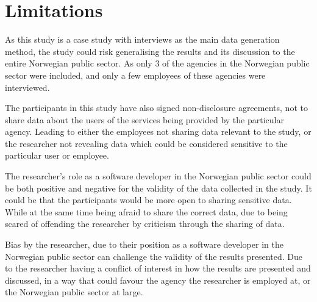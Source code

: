 

\section{Limitations}
As this study is a case study with interviews as the main data generation method, the study could risk generalising the results and its discussion to the entire Norwegian public sector. As only 3 of the agencies in the Norwegian public sector were included, and only a few employees of these agencies were interviewed.

The participants in this study have also signed non-disclosure agreements, not to share data about the users of the services being provided by the particular agency. Leading to either the employees not sharing data relevant to the study, or the researcher not revealing data which could be considered sensitive to the particular user or employee. 

The researcher's role as a software developer in the Norwegian public sector could be both positive and negative for the validity of the data collected in the study. It could be that the participants would be more open to sharing sensitive data. While at the same time being afraid to share the correct data, due to being scared of offending the researcher by criticism through the sharing of data.

Bias by the researcher, due to their position as a software developer in the Norwegian public sector can challenge the validity of the results presented. Due to the researcher having a conflict of interest in how the results are presented and discussed, in a way that could favour the agency the researcher is employed at, or the Norwegian public sector at large.

